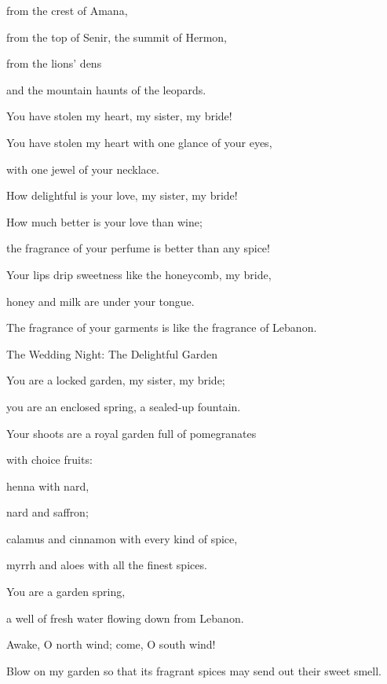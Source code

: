 {from the crest
of Amana,
\par }{\Q from the top
of Senir,
the summit of Hermon,
\par }{\Q from the lions’
dens
\par }{\Q and the mountain
haunts of the leopards.
\par }{\Q {}You have stolen my heart,
my sister,
my bride!
\par }{\Q You have stolen my heart
with one
glance of your eyes,
\par }{\Q with one
jewel of your necklace.
\par }{\Q {}How
delightful
is your love, my
sister,
my bride!
\par }{\Q How
much
better is
your love than
wine;
\par }{\Q the fragrance
of your perfume
is better than
any
spice!
\par }{\Q {}Your lips
drip
sweetness like the honeycomb,
my bride,
\par }{\Q honey
and milk
are under
your tongue.
\par }{\Q The fragrance
of your garments
is like the fragrance
of Lebanon.
\par }{\SH The Wedding Night: The Delightful Garden
\par }{\SH 
{}
\par }{\Q {}You are a locked
garden,
my sister,
my bride;
\par }{\Q you are an enclosed
spring,
a sealed-up
fountain.
\par }{\Q {}Your shoots
are a royal garden
full of pomegranates
\par }{\Q with
choice
fruits:
\par }{\Q henna
with
nard,
\par }{\Q {}nard
and saffron;
\par }{\Q calamus
and cinnamon
with
every kind
of spice,
\par }{\Q myrrh
and aloes
with
all
the finest
spices.
\par }{\Q {}You are a garden
spring,
\par }{\Q a well
of fresh
water
flowing
down from
Lebanon.
\par }{\SH 
{}
\par }{\Q {}Awake,
O north
wind; come,
O south wind!
\par }{\Q Blow
on my garden
so that its fragrant
spices
may send out their sweet smell.

}
